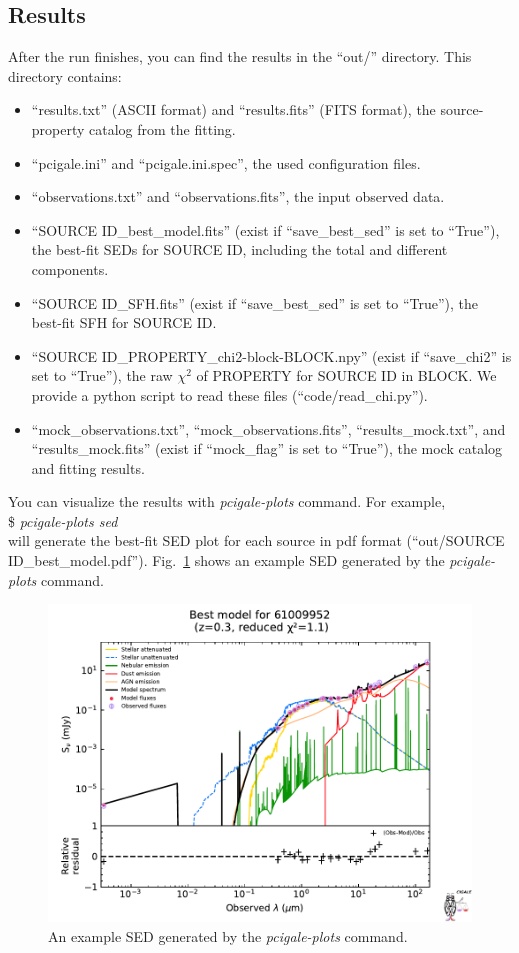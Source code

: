 \subsection{Results}\label{sec:pdf_res}
After the run finishes, you can find the results in the ``out/'' directory. 
This directory contains:
\begin{itemize}
    \item ``results.txt'' (ASCII format) and ``results.fits'' (FITS format), the source-property catalog from the fitting.
    \item ``pcigale.ini'' and ``pcigale.ini.spec'', the used configuration files. 
    \item ``observations.txt'' and ``observations.fits'', the input observed data. 
    \item ``{SOURCE ID}\_best\_model.fits'' (exist if ``save\_best\_sed'' is set to ``True''), the best-fit SEDs for {SOURCE ID}, including the total and different components.
    \item ``{SOURCE ID}\_SFH.fits'' (exist if ``save\_best\_sed'' is set to ``True''), the best-fit SFH for {SOURCE ID}.
    \item ``{SOURCE ID}\_{PROPERTY}\_chi2-block-{BLOCK}.npy'' (exist if ``save\_chi2'' is set to ``True''), the raw $\chi^2$ of {PROPERTY} for {SOURCE ID} in {BLOCK}. 
    We provide a {\sc python} script to read these files (``code/read\_chi.py''). 
    \item ``mock\_observations.txt'', ``mock\_observations.fits'', ``results\_mock.txt'', and ``results\_mock.fits'' (exist if ``mock\_flag'' is set to ``True''), the mock catalog and fitting results. 
\end{itemize}
You can visualize the results with \textit{pcigale-plots} command. 
For example, \\
\$ \textit{pcigale-plots sed}\\
will generate the best-fit SED plot for each source in pdf format (``out/{SOURCE ID}\_best\_model.pdf'').
Fig.~\ref{fig:exm_sed} shows an example SED generated by the \textit{pcigale-plots} command.

\begin{figure}[ht]
\centering
\includegraphics[width=\columnwidth]{pdfanalysis/exm_sed.pdf}
\caption[An example SED generated by the \textit{pcigale-plots} command]{An example SED generated by the \textit{pcigale-plots} command.}
\label{fig:exm_sed}
\end{figure}